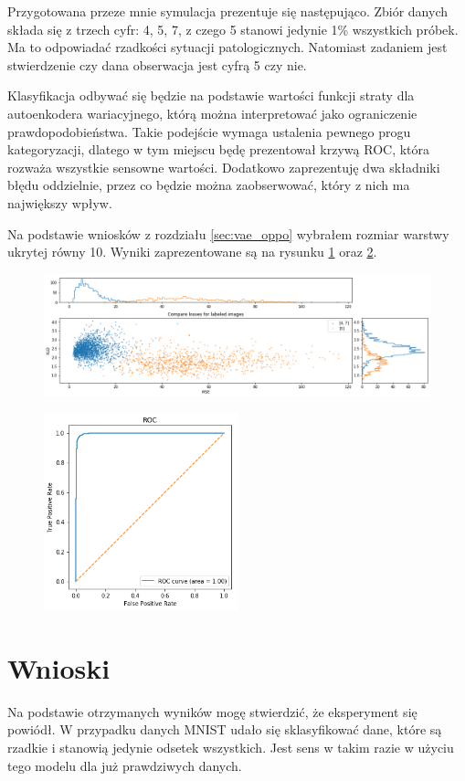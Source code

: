 Przygotowana przeze mnie symulacja prezentuje się następująco. Zbiór danych składa się z trzech cyfr: 4, 5, 7, z czego 5 stanowi jedynie 1\% wszystkich próbek. Ma to odpowiadać rzadkości sytuacji patologicznych. Natomiast zadaniem jest stwierdzenie czy dana obserwacja jest cyfrą 5 czy nie.

Klasyfikacja odbywać się będzie na podstawie wartości funkcji straty dla autoenkodera wariacyjnego, którą można interpretować jako ograniczenie prawdopodobieństwa. Takie podejście wymaga ustalenia pewnego progu kategoryzacji, dlatego w tym miejscu będę prezentował krzywą ROC, która rozważa wszystkie sensowne wartości. Dodatkowo zaprezentuję dwa składniki błędu oddzielnie, przez co będzie można zaobserwować, który z nich ma największy wpływ.

Na podstawie wniosków z rozdziału \ref{sec:vae_oppo} wybrałem rozmiar warstwy ukrytej równy 10. Wyniki zaprezentowane są na rysunku \ref{fig:mnist_compare} oraz \ref{fig:mnist_roc}.

\begin{figure}[h!]
    \centering
    \includegraphics[width=1.0\textwidth]{images/mnist_compare}
    \caption{}
    \label{fig:mnist_compare}
\end{figure}

\begin{figure}[h!]
    \centering
    \includegraphics[width=0.5\textwidth]{images/mnist_roc}
    \caption{}
    \label{fig:mnist_roc}
\end{figure}

\section{Wnioski}

Na podstawie otrzymanych wyników mogę stwierdzić, że eksperyment się powiódł. W przypadku danych MNIST udało się sklasyfikować dane, które są rzadkie i stanowią jedynie odsetek wszystkich. Jest sens w takim razie w użyciu tego modelu dla już prawdziwych danych.
